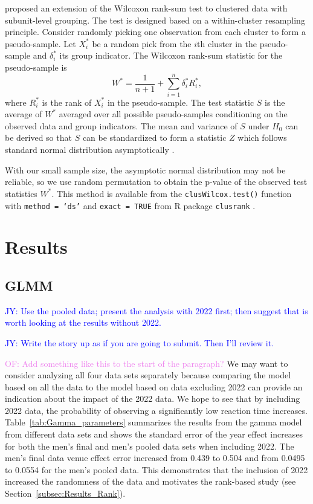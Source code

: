 \documentclass[12pt, letterpaper, titlepage]{article}
\newcommand{\jy}[1]{\textcolor{blue}{JY: #1}}
\newcommand{\of}[1]{\textcolor{violet}{OF: #1}}
\begin{document}
\citet{datta2005rank} proposed an extension of the Wilcoxon rank-sum test to
clustered data with subunit-level grouping. The test is designed based on a
within-cluster resampling principle. Consider randomly picking one observation
from each cluster to form a pseudo-sample. Let $X_i^*$ be a random pick from the
$i$th cluster in the pseudo-sample and $\delta_i^*$ its group indicator. The
Wilcoxon rank-sum statistic for the pseudo-sample is
\[
W^* = \frac{1}{n + 1} + \sum_{i=1}^{n} \delta_{i}^{*} R_{i}^{*},
\]
where $R_{i}^{*}$ is the rank of $X_{i}^{*}$ in the pseudo-sample.
The test statistic $S$ is the average of $W^*$ averaged over all possible
pseudo-samples conditioning on the observed data and group indicators.
The mean and variance of $S$ under $H_0$ can be derived so that $S$ can be
standardized to form a statistic $Z$ which follows standard normal distribution
asymptotically \citep[p.910]{datta2005rank}.


With our small sample size, the asymptotic normal distribution may not be
reliable, so we use random permutation to obtain the p-value of the observed
test statistics $W^*$. This method is
available from the \texttt{clusWilcox.test()} function with
\texttt{method = `ds'} and \texttt{exact = TRUE} from R package
\texttt{clusrank} \citep{jiang2020wilcoxon}.


\section{Results} \label{sec:Results}

\subsection{GLMM} \label{subsec:Results_GLMM}



\jy{Use the pooled data; present the analysis with 2022 first; then suggest that
  is worth looking at the results without 2022.}

\jy{Write the story up as if you are going to submit. Then I'll review it.}

\of{Add something like this to the start of the paragraph?}
We may want to consider analyzing all four data sets separately because
comparing the model based on all the data to the model based on data excluding 
2022 can provide an indication about the impact of the 2022 data.
We hope to see that by including 2022 data,
the probability of observing a significantly low reaction time increases. 
Table~\ref{tab:Gamma_parameters} summarizes the results from the gamma model 
from different data sets and shows the standard error of the year
effect increases for both the men's final and men's pooled data sets when
including 2022.  The men's final data venue effect error increased from 0.439
to 0.504 and from 0.0495 to 0.0554 for the men's pooled data.  This demonstrates
that the inclusion of 2022 increased the randomness of the data and motivates
the rank-based study (see Section~\ref{subsec:Results_Rank}).
\end{document}
